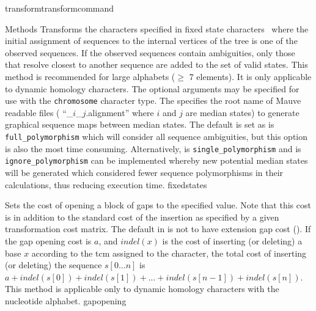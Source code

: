 \begin{command}{transform}{transformcommand}
\begin{arguments}
\begin{argumentgroup}{Methods}
          {Transforms the characters specified in fixed state characters~\cite{wheeler1999a}
          where the initial assignment of sequences to the internal vertices of
          the tree is one of the observed sequences. If the observed sequences
          contain ambiguities, only those that resolve closest to another
          sequence are added to the set of valid states. This method is
          recommended for large alphabets ($\ge$ 7 elements). It is only
          applicable to dynamic homology characters.  The optional arguments may be specified
          for use with the \texttt{chromosome} character type.  The \poystring specifies the
          root name of Mauve \cite{darlingetal2004} readable files ( ``\poystring\_$i$\_$j$.alignment'' 
          where $i$ and $j$ are median states) to generate graphical sequence maps between median states.  The default
           is set as \poylident is \texttt{full\_polymorphism} which will consider all sequence ambiguities, but this option is also the most 
           time consuming. Alternatively, \poylident is \texttt{single\_polymorphism} and \poylident is \texttt{ignore\_polymorphism} can be 
           implemented whereby new potential median states will be generated which considered fewer sequence polymorphisms in their 
           calculations, thus reducing execution time.}
          {fixedstates}
          
            {Sets the cost of opening a block of gaps to the specified value. Note that
            this cost is in addition to the standard cost of the insertion as
            specified by a given transformation cost matrix.
            The default in \poy is not to have extension
            gap cost (). If the gap
            opening cost is
            $a$, and $indel(x)$ is the cost of inserting (or deleting) a
            base $x$ according to the tcm assigned to the character, the total
            cost of inserting (or deleting) the sequence $s[0...n]$ is $a +
            indel(s[0]) + indel(s[1]) + ... + indel(s[n - 1]) + indel(s[n]).$
            This method is applicable only to dynamic homology characters with
            the nucleotide alphabet.} 
            {gapopening}


\end{argumentgroup}
\end{arguments}
\end{command}
